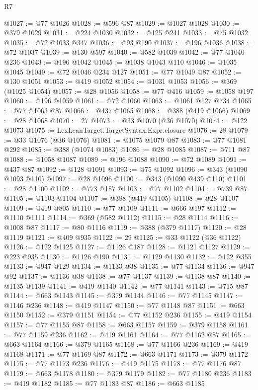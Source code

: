 \begin{lexlean}{R7}
\begin{coremodule}
@1027 := @77 @1026
@1028 := @596 @87
@1029 := @1027 @1028
@1030 := @379 @1029
@1031 := @224 @1030
@1032 := @125 @241
@1033 := @75 @1032
@1035 := @72 @1033 @347
@1036 := @93 @190
@1037 := @196 @1036
@1038 := @72 @1037
@1039 := @130 @597
@1040 := @582 @1039
@1042 := @77 @1040 @236
@1043 := @196 @1042
@1045 := @1038 @1043 @110
@1046 := @1035 @1045
@1049 := @72 @1046 @234 @127
@1051 := @77 @1049 @87
@1052 := @130 @1051
@1053 := @419 @1052
@1054 := @1031 @1053
@1056 := @369 (@1025 @1054)
@1057 := @28 @1056
@1058 := @77 @416
@1059 := @1058 @197
@1060 := @196 @1059
@1061 := @72 @1060
@1063 := @1061 @127 @734
@1065 := @77 @1063 @87
@1066 := @437 @1065
@1068 := @388 (@419 @1066)
@1069 := @28 @1068
@1070 := 27
@1073 := @33 @1070 (@36 @1070)
@1074 := @122 @1073
@1075 := LexLeanTarget.TargetSyntax.Expr.closure
@1076 := 28
@1079 := @33 @1076 (@36 @1076)
@1081 := @1075 @1079 @87
@1083 := @77 @1081 @292
@1085 := @388 (@1074 @1083)
@1086 := @28 @1085
@1087 := @711 @87
@1088 := @1058 @1087
@1089 := @196 @1088
@1090 := @72 @1089
@1091 := @437 @87
@1092 := @128 @1091
@1093 := @75 @1092
@1096 := @343 (@1090 @1093 @110)
@1097 := @28 @1096
@1100 := @343 (@1090 @439 @110)
@1101 := @28 @1100
@1102 := @773 @187
@1103 := @77 @1102
@1104 := @739 @87
@1105 := @1103 @1104
@1107 := @388 (@419 @1105)
@1108 := @28 @1107
@1109 := @419 @805
@1110 := @77 @1109
@1111 := @666 @197
@1112 := @1110 @1111
@1114 := @369 (@582 @1112)
@1115 := @28 @1114
@1116 := @1008 @87
@1117 := @80 @1116
@1119 := @388 (@379 @1117)
@1120 := @28 @1119
@1121 := @409 @935
@1122 := 29
@1125 := @33 @1122 (@36 @1122)
@1126 := @122 @1125
@1127 := @1126 @187
@1128 := @1121 @1127
@1129 := @223 @935
@1130 := @1126 @190
@1131 := @1129 @1130
@1132 := @122 @355
@1133 := @947 @129
@1134 := @1133 @38
@1135 := @77 @1134
@1136 := @947 @92
@1137 := @1136 @38
@1138 := @77 @1137
@1139 := @1138 @87
@1140 := @1135 @1139
@1141 := @419 @1140
@1142 := @77 @1141
@1143 := @715 @87
@1144 := @663 @1143
@1145 := @379 @1144
@1146 := @77 @1145
@1147 := @1146 @236
@1148 := @419 @1147
@1150 := @77 @1148 @87
@1151 := @663 @1150
@1152 := @379 @1151
@1154 := @77 @1152 @236
@1155 := @419 @1154
@1157 := @77 @1155 @87
@1158 := @663 @1157
@1159 := @379 @1158
@1161 := @77 @1159 @236
@1162 := @419 @1161
@1164 := @77 @1162 @87
@1165 := @663 @1164
@1166 := @379 @1165
@1168 := @77 @1166 @236
@1169 := @419 @1168
@1171 := @77 @1169 @87
@1172 := @663 @1171
@1173 := @379 @1172
@1175 := @77 @1173 @236
@1176 := @419 @1175
@1178 := @77 @1176 @87
@1179 := @663 @1178
@1180 := @379 @1179
@1182 := @77 @1180 @236
@1183 := @419 @1182
@1185 := @77 @1183 @87
@1186 := @663 @1185

\end{coremodule}
\end{lexlean}
